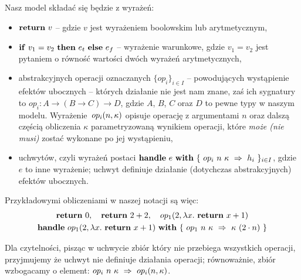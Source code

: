 Nasz model składać się będzie z wyrażeń:
\begin{itemize}
\item \(\mathbf{return}\ v\) -- gdzie \(v\) jest wyrażeniem boolowskim lub arytmetycznym,
\item \(\mathbf{if}\ v_1 = v_2\ \mathbf{then}\ e_t\ \mathbf{else}\ e_f\) -- wyrażenie warunkowe, gdzie \(v_1 = v_2\) jest pytaniem o równość wartości dwóch wyrażeń arytmetycznych,
\item abstrakcyjnych operacji oznaczanych \(\{op_i\}_{i \in I}\) -- powodujących wystąpienie efektów ubocznych -- których działanie nie jest nam znane, zaś ich sygnatury to \(op_i: A \rightarrow (B \rightarrow C) \rightarrow D\), gdzie \(A\), \(B\), \(C\) oraz \(D\) to pewne typy w naszym modelu. Wyrażenie~\(op_{i}(n, \kappa)\) opisuje operację z argumentami \(n\) oraz dalszą częścią obliczenia \(\kappa\) parametryzowaną wynikiem operacji, które \textit{może (nie musi)} zostać wykonane po jej wystąpieniu,
\item uchwytów, czyli wyrażeń postaci \(\mathbf{handle}\ e\ \mathbf{with}\ \{\ op_i\ n\ \kappa\ \Rightarrow\ h_i\ \}_{i \in I}\), gdzie \(e\) to inne wyrażenie; uchwyt definiuje działanie (dotychczas abstrakcyjnych) efektów ubocznych. 
\end{itemize}

Przykładowymi obliczeniami w naszej notacji są więc:
\begin{equation}
\begin{gathered}
  \return{0},\quad\return{2 + 2},\quad \opi{1}{2}{\fun{x}{\return{x + 1}}} \\
  \handle{\opi{1}{2}{\fun{x}{\return{x + 1}}}}{\{\ \hcase{op_1}{n\ \kappa}{\kappa\ (2 \cdot n)} \ \}}
\end{gathered}
\end{equation}

Dla czytelności, pisząc w uchwycie zbiór który nie przebiega wszystkich operacji, przyjmujemy że uchwyt nie definiuje działania operacji; równoważnie, zbiór wzbogacamy o element: \(op_i\ n\ \kappa\ \Rightarrow\ op_i(n, \kappa)\).

